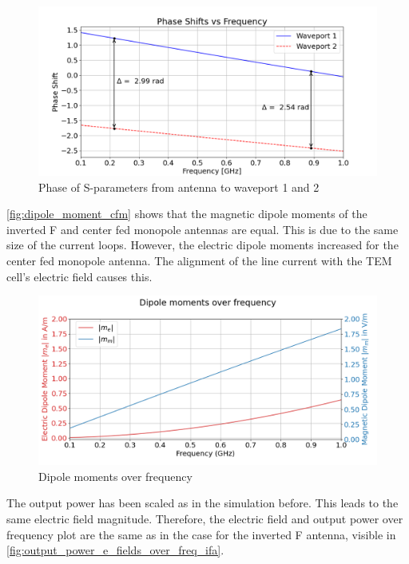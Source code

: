 \begin{figure}[h]
    \centering
    \includegraphics[width=1\linewidth]{Documentation//content//30_simulations//img/phase_shift_cfm.png}
    \caption{Phase of S-parameters from antenna to waveport 1 and 2}
    \label{fig:phase_shift_cfm}
\end{figure}

\autoref{fig:dipole_moment_cfm} shows that the magnetic dipole moments of the inverted F and center fed monopole antennas are equal. This is due to the same size of the current loops. However, the electric dipole moments increased for the center fed monopole antenna. The alignment of the line current with the TEM cell's electric field causes this.

\begin{figure}[h]
    \centering
    \includegraphics[width=1\linewidth]{Documentation//content//30_simulations//img/dipole_moment_cfm.png}
    \caption{Dipole moments over frequency}
    \label{fig:dipole_moment_cfm}
\end{figure}


The output power has been scaled as in the simulation before. This leads to the same electric field magnitude. Therefore, the electric field and output power over frequency plot are the same as in the case for the inverted F antenna, visible in \autoref{fig:output_power_e_fields_over_freq_ifa}.

